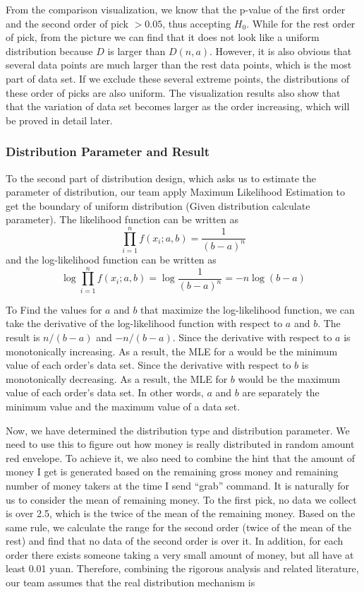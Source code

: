 \documentclass{scrartcl}
\begin{document}
From the comparison visualization, we know that the p-value of the first order and the second order of pick $>0.05$, thus accepting $H_0$. While for the rest order of pick, from the picture we can find that it does not look like a uniform distribution because $D$ is larger than $D(n,a)$. However, it is also obvious that several data points are much larger than the rest data points, which is the most part of data set. If we exclude these several extreme points, the distributions of these order of picks are also uniform. The visualization results also show that that the variation of data set becomes larger as the order increasing, which will be proved in detail later.
\subsubsection{Distribution Parameter and Result}
To the second part of distribution design, which asks us to estimate the parameter of distribution, our team apply Maximum Likelihood Estimation to get the boundary of uniform distribution (Given distribution calculate parameter).
The likelihood function can be written as
$$\prod \limits_{i=1}^n f(x_{i};a,b) = \frac{1}{(b-a)^n}$$
\indent and the log-likelihood function can be written as 
$$\log \prod \limits_{i=1}^n f(x_{i};a,b) = \log \frac{1}{(b-a)^n}=-n\log(b-a)$$\par
To Find the values for $a$ and $b$ that maximize the log-likelihood function, we can take the derivative of the log-likelihood function with respect to $a$ and $b$. The result is $n/(b-a)$ and $-n/(b-a)$. Since the derivative with respect to $a$ is monotonically increasing. As a result, the MLE for a would be the minimum value of each order's data set.  Since the derivative with respect to $b$ is monotonically decreasing. As a result, the MLE for $b$ would be the maximum value of each order's data set. In other words, $a$ and $b$ are separately the minimum value and the maximum value of a data set.

Now, we have determined the distribution type and distribution parameter. We need to use this to figure out how money is really distributed in random amount red envelope. To achieve it, we also need to combine the hint that the amount of money I get is generated based on the remaining gross money and remaining number of money takers at the time I send “grab” command. It is naturally for us to consider the mean of remaining money. To the first pick, no data we collect is over 2.5, which is the twice of the mean of the remaining money. Based on the same rule, we calculate the range for the second order (twice of the mean of the rest) and find that no data of the second order is over it. In addition, for each order there exists someone taking a very small amount of money, but all have at least 0.01 yuan. Therefore, combining the rigorous analysis and related literature, our team assumes that the real distribution mechanism is
\end{document}
